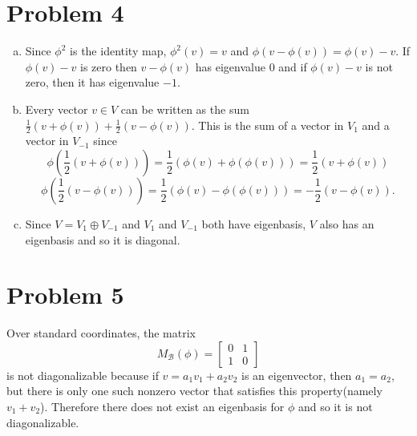 \documentclass{article}
\begin{document}
\section*{Problem 4}
\begin{enumerate}[(a)]
    \item Since $\phi^2$ is the identity map, $\phi^2(v) = v$ and $\phi(v-\phi(v)) = \phi(v) - v$.
    If $\phi(v) - v$ is zero then $v-\phi(v)$ has eigenvalue $0$ and if $\phi(v) - v$ is not zero,
    then it has eigenvalue $-1$.
    \item Every vector $v \in V$ can be written as the sum $\frac{1}{2}(v + \phi(v)) + \frac{1}{2}(v - \phi(v))$.
    This is the sum of a vector in $V_1$ and a vector in $V_{-1}$ since
    \[
        \phi(\frac{1}{2}(v+\phi(v))) = \frac{1}{2}(\phi(v) + \phi(\phi(v))) = \frac{1}{2}(v+\phi(v))
    \]
    \[
        \phi(\frac{1}{2}(v-\phi(v))) = \frac{1}{2}(\phi(v) - \phi(\phi(v))) = -\frac{1}{2}(v-\phi(v)).
    \]
    \item Since $V = V_1 \oplus V_{-1}$ and $V_1$ and $V_{-1}$ both have eigenbasis, 
    $V$ also has an eigenbasis and so it is diagonal.
\end{enumerate}
\newpage
\section*{Problem 5}
Over standard coordinates, the matrix 
\[
    M_\mathcal{B}(\phi) =
    \begin{bmatrix}
        0 & 1 \\ 
        1 & 0
    \end{bmatrix}
\]
is not diagonalizable because if $v = a_1v_1 + a_2v_2$ is an eigenvector,
then $a_1 = a_2$, but there is only one such nonzero vector that satisfies this property(namely $v_1 + v_2$). 
Therefore there does not exist an eigenbasis for $\phi$ and so it is not diagonalizable.
\end{document}
